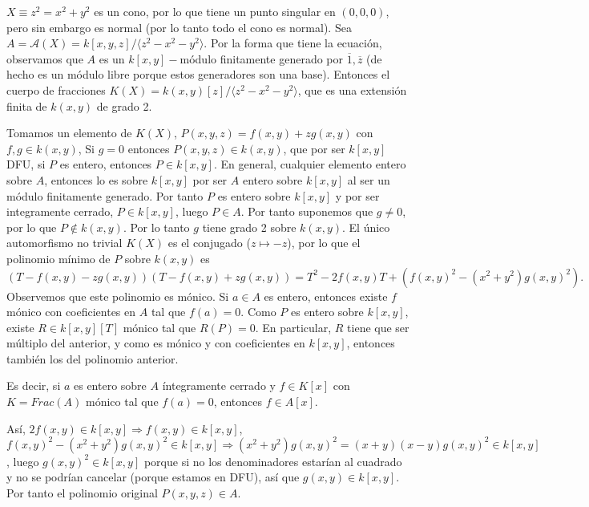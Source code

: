 \documentclass[ACGA.tex]{subfiles}
\begin{document}
\begin{ejs}
$X\equiv z^2=x^2+y^2$ es un cono, por lo que tiene un punto singular en $(0,0,0)$, pero sin embargo es normal (por lo tanto todo el cono es normal). Sea $A=\mathcal{A}(X)=k[x,y,z]/\langle z^2-x^2-y^2\rangle$. Por la forma que tiene la ecuación, observamos que $A$ es un $k[x,y]-$módulo finitamente generado por $\overline{1},\overline{z}$ (de hecho es un módulo libre porque estos generadores son una base). Entonces el cuerpo de fracciones $K(X)=k(x,y)[z]/\langle z^2-x^2-y^2\rangle$, que es una extensión finita de $k(x,y)$ de grado 2.  

Tomamos un elemento de $K(X)$, $P(x,y,z)=f(x,y)+zg(x,y)$ con $f,g\in k(x,y)$, Si $g=0$ entonces $P(x,y,z)\in k(x,y)$, que por ser $k[x,y]$ DFU, si $P$ es entero, entonces $P\in k[x,y]$.  En general, cualquier elemento entero sobre $A$, entonces lo es sobre $k[x,y]$ por ser $A$ entero sobre $k[x,y]$ al ser un módulo finitamente generado. Por tanto $P$ es entero sobre $k[x,y]$ y por ser integramente cerrado, $P\in k[x,y]$, luego $P\in A$. Por tanto suponemos que $g\neq 0$, por lo que $P\notin k(x,y)$. Por lo tanto $g$ tiene grado 2 sobre $k(x,y)$. El único automorfismo no trivial $K(X)$ es el conjugado ($z\mapsto -z$), por lo que el polinomio mínimo de $P$ sobre $k(x,y)$ es
$$(T-f(x,y)-zg(x,y))(T-f(x,y)+zg(x,y))=T^2-2f(x,y)T+(f(x,y)^2-(x^2+y^2)g(x,y)^2).$$
Observemos que este polinomio es mónico. Si $a\in A$ es entero, entonces existe $f$ mónico con coeficientes en $A$ tal que $f(a)=0$. Como $P$ es entero sobre $k[x,y]$, existe $R\in k[x,y][T]$ mónico tal que $R(P)=0$. En particular, $R$ tiene que ser múltiplo del anterior, y como es mónico y con coeficientes en $k[x,y]$, entonces también los del polinomio anterior.

Es decir, si $a$ es entero sobre $A$ íntegramente cerrado y $f\in K[x]$ con $K=Frac(A)$ mónico tal que $f(a)=0$, entonces $f\in A[x]$. 

Así, $2f(x,y)\in k[x,y]\Rightarrow f(x,y)\in k[x,y]$, $f(x,y)^2-(x^2+y^2)g(x,y)^2\in k[x,y]\Rightarrow (x^2+y^2)g(x,y)^2=(x+y)(x-y)g(x,y)^2\in k[x,y]$, luego $g(x,y)^2\in k[x,y]$ porque si no los denominadores estarían al cuadrado y no se podrían cancelar (porque estamos en DFU), así que $g(x,y)\in k[x,y]$. Por tanto el polinomio original $P(x,y,z)\in A$. 
\end{ejs}
\end{document}
